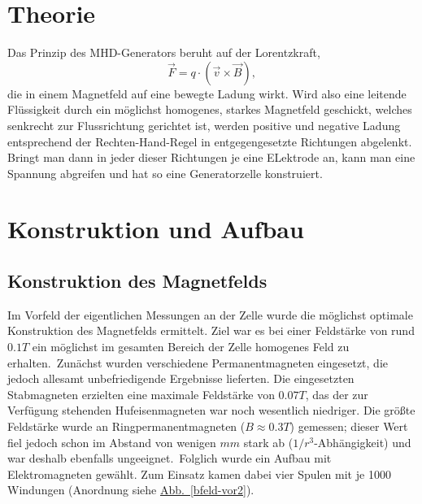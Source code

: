 \documentclass[11pt]{scrartcl}
\begin{document}
\section{Theorie}	%


Das Prinzip des MHD-Generators beruht auf der Lorentzkraft,
\begin{equation*}
\vec{F} = q \cdot \left(\vec{v} \times \vec{B} \right),
\end{equation*}
die in einem Magnetfeld auf eine bewegte Ladung wirkt. Wird also eine leitende Fl\"ussigkeit durch ein m\"oglichst homogenes, starkes Magnetfeld geschickt, welches senkrecht zur Flussrichtung gerichtet ist, werden positive und negative Ladung entsprechend der Rechten-Hand-Regel in entgegengesetzte Richtungen abgelenkt. Bringt man dann in jeder dieser Richtungen je eine ELektrode an, kann man eine Spannung abgreifen und hat so eine Generatorzelle konstruiert. 

\section{Konstruktion und Aufbau}

\subsection{Konstruktion des Magnetfelds}		%
Im Vorfeld der eigentlichen Messungen an der Zelle wurde die möglichst optimale Konstruktion des Magnetfelds ermittelt. Ziel war es bei einer Feldstärke von rund $0.1 T$ ein möglichst im gesamten Bereich der Zelle homogenes Feld zu erhalten.\
Zunächst wurden verschiedene Permanentmagneten eingesetzt, die jedoch allesamt unbefriedigende Ergebnisse lieferten. Die eingesetzten Stabmagneten erzielten eine maximale Feldstärke von $0.07T$, das der zur Verfügung stehenden Hufeisenmagneten war noch wesentlich niedriger. Die größte Feldstärke wurde an Ringpermanentmagneten ($B\approx0.3T$) gemessen; dieser Wert fiel jedoch schon im Abstand von wenigen $mm$ stark ab ($1/r^3$-Abhängigkeit) und war deshalb ebenfalls ungeeignet.\
Folglich wurde ein Aufbau mit Elektromagneten gewählt. Zum Einsatz kamen dabei vier Spulen mit je 1000 Windungen (Anordnung siehe \hyperref[bfeld-vor2]{Abb.~\ref{bfeld-vor2}}).
\end{document}
